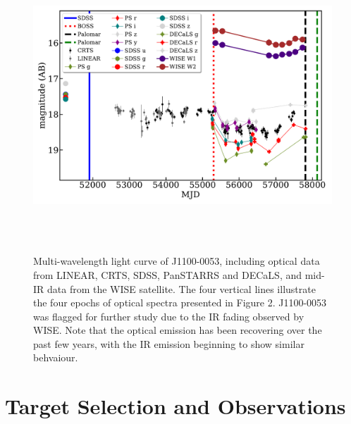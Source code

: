 \documentclass[a4paper,fleqn,usenatbib]{mnras}
\begin{document}
\begin{figure}
  \centering
  \includegraphics[width=16.00cm, height=11.00cm, trim=0.0cm 0.0cm 0.0cm 0.0cm, clip]
  {../plots/lc/J110057_lc_20180501.pdf}
  \caption[]{
    Multi-wavelength light curve of J1100-0053, including optical data
    from LINEAR, CRTS, SDSS, PanSTARRS and DECaLS, and mid-IR data from
    the WISE satellite.  The four vertical lines illustrate the four
    epochs of optical spectra presented in Figure 2.  J1100-0053 was
    flagged for further study due to the IR fading observed by WISE.  Note
    that the optical emission has been recovering over the past few years,
    with the IR emission beginning to show similar behvaiour.}
  \label{fig:J110057_LC_CRTS}
\end{figure}
\section{Target Selection and Observations}  
\end{document}
